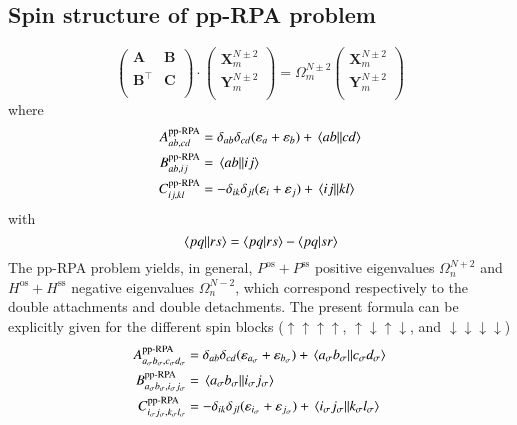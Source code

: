 \documentclass[aip,jcp,reprint,noshowkeys,superscriptaddress]{revtex4-1}
\newcommand{\ppRPA}{\text{pp-RPA}}
\newcommand{\e}[1]{\eps_{#1}}
\newcommand{\Om}[2]{\Omega_{#1}^{#2}}
\newcommand{\bA}[2]{\mathbf{A}_{#1}^{#2}}
\newcommand{\bB}[2]{\mathbf{B}_{#1}^{#2}}
\newcommand{\bC}[2]{\mathbf{C}_{#1}^{#2}}
\newcommand{\bX}[2]{\mathbf{X}_{#1}^{#2}}
\newcommand{\bY}[2]{\mathbf{Y}_{#1}^{#2}}
\newcommand{\eps}{\varepsilon}
\newcommand{\sig}{\sigma}
\newcommand{\up}{\uparrow}
\newcommand{\dw}{\downarrow}
\newcommand{\ssp}{\text{ss}}
\newcommand{\osp}{\text{os}}
\begin{document}
\subsection{Spin structure of pp-RPA problem}


\begin{equation}
\label{eq:LR-RPA}
	\begin{pmatrix}
		\bA{}{}				&	\bB{}{}	\\
		\bB{}{\intercal}	&	\bC{}{}	\\
	\end{pmatrix}
	\cdot
	\begin{pmatrix}
		\bX{m}{N\pm2}	\\
		\bY{m}{N\pm2}	\\
	\end{pmatrix}
	=
	\Om{m}{N\pm2}
	\begin{pmatrix}
		\bX{m}{N\pm2}	\\
		\bY{m}{N\pm2}	\\
	\end{pmatrix}
\end{equation}
where
\begin{subequations}
\begin{align}
	A_{ab,cd}^{\ppRPA} & = \delta_{ab} \delta_{cd} (\e{a} + \e{b}) + \mel{ab}{}{cd}
	\\ 
	B_{ab,ij}^{\ppRPA} & = \mel{ab}{}{ij}
	\\ 
	C_{ij,kl}^{\ppRPA} & = - \delta_{ik} \delta_{jl} (\e{i} + \e{j}) +\mel{ij}{}{kl}
\end{align}
\end{subequations}
with
\begin{equation}
	\mel{pq}{}{rs} = \braket{pq}{rs} - \braket{pq}{sr}
\end{equation}
The pp-RPA problem yields, in general, $P^{\osp} + P^{\ssp}$ positive eigenvalues $\Om{n}{N+2}$ and $H^{\osp} + H^{\ssp}$ negative eigenvalues $\Om{n}{N-2}$, which  correspond respectively to the double attachments and double detachments.
The present formula can be explicitly given for the different spin blocks ($\up\up\up\up$, $\up\dw\up\dw$, and $\dw\dw\dw\dw$)
\begin{subequations}
\begin{align}
	A_{a_\sig b_\sig,c_\sig d_\sig}^{\ppRPA} & = \delta_{ab} \delta_{cd} (\e{a_\sig} + \e{b_\sig}) + \mel{a_\sig b_\sig}{}{c_\sig d_\sig}
	\\ 
	B_{a_\sig b_\sig,i_\sig j_\sig}^{\ppRPA} & = \mel{a_\sig b_\sig }{}{i_\sig j_\sig}
	\\ 
	C_{i_\sig j_\sig,k_\sig l_\sig}^{\ppRPA} & = - \delta_{ik} \delta_{jl} (\e{i_\sig} + \e{j_\sig}) + \mel{i_\sig j_\sig}{}{k_\sig l_\sig}
\end{align}
\end{subequations}
\end{document}
